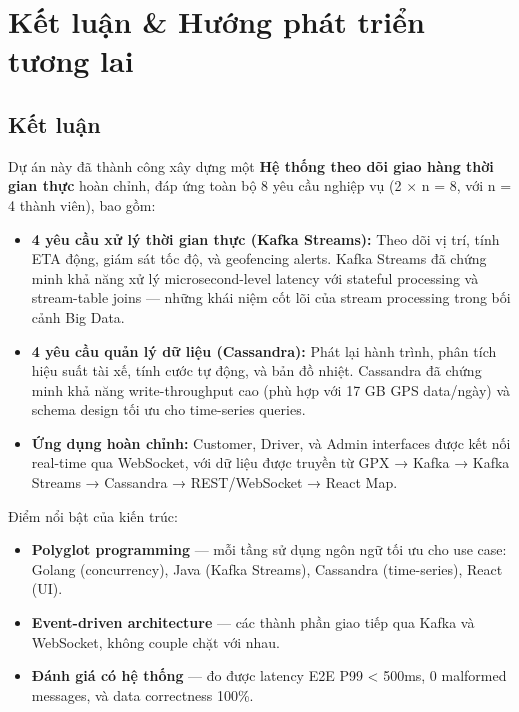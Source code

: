\section{Kết luận \& Hướng phát triển tương lai}
\label{sec:conclusion}

\subsection{Kết luận}
\label{sec:summary}

Dự án này đã thành công xây dựng một \textbf{Hệ thống theo dõi giao hàng thời gian thực} hoàn chỉnh, đáp ứng toàn bộ 8 yêu cầu nghiệp vụ (2 × n = 8, với n = 4 thành viên), bao gồm:

\bigskip
\begin{itemize}
    \item \textbf{4 yêu cầu xử lý thời gian thực (Kafka Streams):} Theo dõi vị trí, tính ETA động, giám sát tốc độ, và geofencing alerts. Kafka Streams đã chứng minh khả năng xử lý microsecond-level latency với stateful processing và stream-table joins — những khái niệm cốt lõi của stream processing trong bối cảnh Big Data.

    \item \textbf{4 yêu cầu quản lý dữ liệu (Cassandra):} Phát lại hành trình, phân tích hiệu suất tài xế, tính cước tự động, và bản đồ nhiệt. Cassandra đã chứng minh khả năng write-throughput cao (phù hợp với 17 GB GPS data/ngày) và schema design tối ưu cho time-series queries.

    \item \textbf{Ứng dụng hoàn chỉnh:} Customer, Driver, và Admin interfaces được kết nối real-time qua WebSocket, với dữ liệu được truyền từ GPX → Kafka → Kafka Streams → Cassandra → REST/WebSocket → React Map.
\end{itemize}

\bigskip
\noindent
Điểm nổi bật của kiến trúc:
\begin{itemize}
    \item \textbf{Polyglot programming} — mỗi tầng sử dụng ngôn ngữ tối ưu cho use case: Golang (concurrency), Java (Kafka Streams), Cassandra (time-series), React (UI).
    \item \textbf{Event-driven architecture} — các thành phần giao tiếp qua Kafka và WebSocket, không couple chặt với nhau.
    \item \textbf{Đánh giá có hệ thống} — đo được latency E2E P99 < 500ms, 0 malformed messages, và data correctness 100\%.
\end{itemize}


